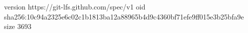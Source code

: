 version https://git-lfs.github.com/spec/v1
oid sha256:10c94a2325e6c02c1b1813ba12a88965b4d9c4360bf71efe9ff015e3b25bfa9e
size 3693
